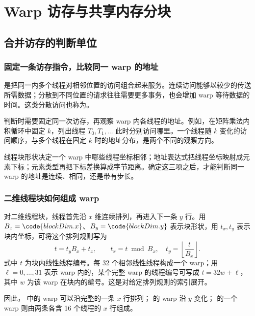 \section{Warp 访存与共享内存分块}
\subsection{合并访存的判断单位}
\subsubsection{固定一条访存指令，比较同一 warp 的地址}
是把同一内多个线程对相邻位置的访问组合起来服务。连续访问能够以较少的传送所需数据；分散到不同位置的请求往往需要更多事务，也会增加 warp 等待数据的时间。这类分散访问也称为。

判断时需要固定同一次访存，再观察 warp 内各线程的地址。例如，在矩阵乘法内积循环中固定 $k$，列出线程 $T_0,T_1,\ldots$ 此时分别访问哪里。一个线程随 $k$ 变化的访问顺序，与多个线程在固定 $k$ 时的地址分布，是两个不同的观察方向。

\begin{keybox}[title={访存分析的三个要素}]
线程块形状决定一个 warp 中哪些线程坐标相邻；地址表达式把线程坐标映射成元素下标；元素类型再把下标差换算成字节距离。确定这三项之后，才能判断同一 warp 的地址是连续、相同，还是带有步长。
\end{keybox}

\subsubsection{二维线程块如何组成 warp}
对二维线程块，线程首先沿 $x$ 维连续排列，再进入下一条 $y$ 行。用 $B_x=\code{blockDim.x}$、$B_y=\code{blockDim.y}$ 表示块形状，用 $t_x,t_y$ 表示块内坐标，可将这个排列规则写为
\begin{equation}
  t=t_yB_x+t_x,\qquad
  t_x=t\bmod B_x,\quad
  t_y=\left\lfloor\frac{t}{B_x}\right\rfloor.
  \label{l7:eq:thread-linear}
\end{equation}
式中 $t$ 为块内线性线程编号。每 32 个相邻线性线程构成一个 warp；用 $\ell=0,\ldots,31$ 表示 warp 内的，某个完整 warp 的线程编号可写成 $t=32w+\ell$，其中 $w$ 为该 warp 在块内的编号。这是对给定排列规则的索引展开。

因此， 中的 warp 可以沿完整的一条 $x$ 行排列； 的 warp 沿 $y$ 变化； 的一个 warp 则由两条各含 16 个线程的 $x$ 行组成。

